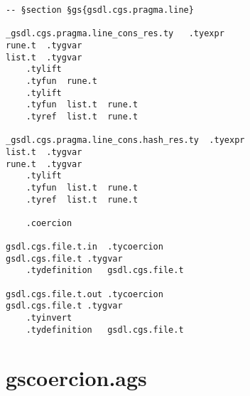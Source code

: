 \documentclass{report}
\begin{document}
\begin{verbatim}
-- §section §gs{gsdl.cgs.pragma.line}

_gsdl.cgs.pragma.line_cons_res.ty	.tyexpr
rune.t	.tygvar
list.t	.tygvar
	.tylift
	.tyfun	rune.t
	.tylift
	.tyfun	list.t	rune.t
	.tyref	list.t	rune.t

_gsdl.cgs.pragma.line_cons.hash_res.ty	.tyexpr
list.t	.tygvar
rune.t	.tygvar
	.tylift
	.tyfun	list.t	rune.t
	.tyref	list.t	rune.t

	.coercion

gsdl.cgs.file.t.in	.tycoercion
gsdl.cgs.file.t	.tygvar
	.tydefinition	gsdl.cgs.file.t

gsdl.cgs.file.t.out	.tycoercion
gsdl.cgs.file.t	.tygvar
	.tyinvert
	.tydefinition	gsdl.cgs.file.t
\end{verbatim}

\section{gscoercion.ags}
\end{document}
